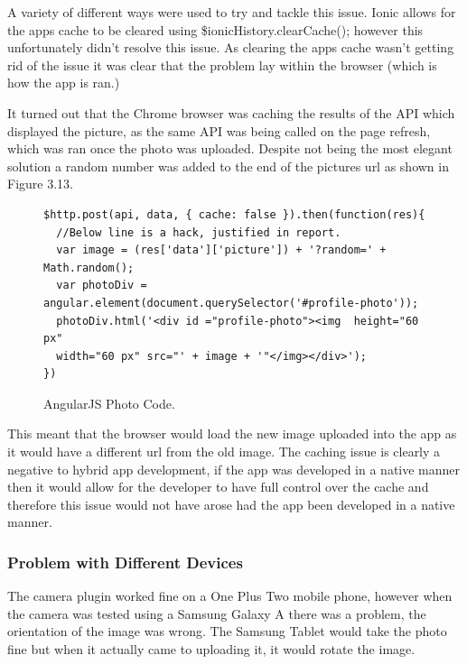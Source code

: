 A variety of different ways were used to try and tackle this issue. Ionic allows for the apps cache to be cleared using \$ionicHistory.clearCache(); however this unfortunately didn't resolve this issue. As clearing the apps cache wasn't getting rid of the issue it was clear that the problem lay within the browser (which is how the app is ran.)

It turned out that the Chrome browser was caching the results of the API which displayed the picture, as the same API was being called on the page refresh, which was ran once the photo was uploaded. Despite not being the most elegant solution a random number was added to the end of the pictures url as shown in Figure 3.13.
\begin{center}
\begin{figure}[H]
\begin{verbatim}
$http.post(api, data, { cache: false }).then(function(res){
  //Below line is a hack, justified in report.
  var image = (res['data']['picture']) + '?random=' + Math.random();
  var photoDiv = angular.element(document.querySelector('#profile-photo'));
  photoDiv.html('<div id ="profile-photo"><img  height="60 px" 
  width="60 px" src="' + image + '"</img></div>');
})
\end{verbatim}
\caption{AngularJS Photo Code.}
\end{figure}
\end{center}

This meant that the browser would load the new image uploaded into the app as it would have a different url from the old image. The caching issue is clearly a negative to hybrid app development, if the app was developed in a native manner then it would allow for the developer to have full control over the cache and therefore this issue would not have arose had the app been developed in a native manner. 

\subsubsection{Problem with Different Devices}
The camera plugin worked fine on a One Plus Two mobile phone, however when the camera was tested using a Samsung Galaxy A there was a problem, the orientation of the image was wrong. The Samsung Tablet would take the photo fine but when it actually came to uploading it, it would rotate the image. 

